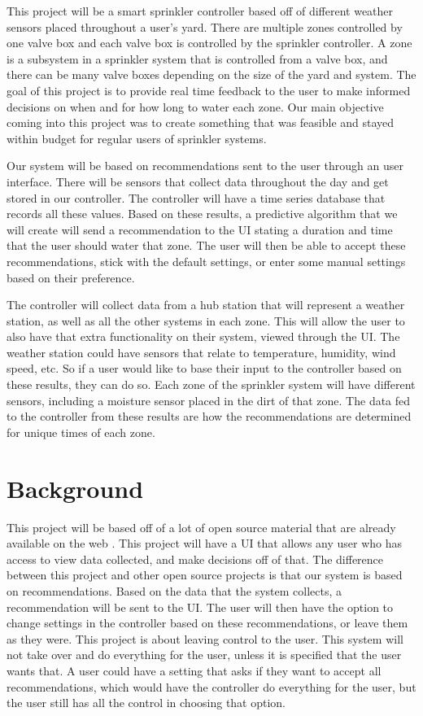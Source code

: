 \documentclass[letterpaper, 10 pt, conference]{ieeeconf}  %
\begin{document}
This project will be a smart sprinkler controller based off of different weather sensors placed throughout a user's yard. There are multiple zones controlled by one valve box and each valve box is controlled by the sprinkler controller. A zone is a subsystem in a sprinkler system that is controlled from a valve box, and there can be many valve boxes depending on the size of the yard and system. The goal of this project is to provide real time feedback to the user to make informed decisions on when and for how long to water each zone. Our main objective coming into this project was to create something that was feasible and stayed within budget for regular users of sprinkler systems.

Our system will be based on recommendations sent to the user through an user interface. There will be sensors that collect data throughout the day and get stored in our controller. The controller will have a time series database that records all these values. Based on these results, a predictive algorithm that we will create will send a recommendation to the UI stating a duration and time that the user should water that zone. The user will then be able to accept these recommendations, stick with the default settings, or enter some manual settings based on their preference. 

The controller will collect data from a hub station that will represent a weather station, as well as all the other systems in each zone. This will allow the user to also have that extra functionality on their system, viewed through the UI. The weather station could have sensors that relate to temperature, humidity, wind speed, etc. So if a user would like to base their input to the controller based on these results, they can do so. Each zone of the sprinkler system will have different sensors, including a moisture sensor placed in the dirt of that zone. The data fed to the controller from these results are how the recommendations are determined for unique times of each zone.


\section{Background}
This project will be based off of a lot of open source material that are already available on the web \cite{SIP}. This project will have a UI that allows any user who has access to view data collected, and make decisions off of that. The difference between this project and other open source projects is that our system is based on recommendations. Based on the data that the system collects, a recommendation will be sent to the UI. The user will then have the option to change settings in the controller based on these recommendations, or leave them as they were. This project is about leaving control to the user. This system will not take over and do everything for the user, unless it is specified that the user wants that. A user could have a setting that asks if they want to accept all recommendations, which would have the controller do everything for the user, but the user still has all the control in choosing that option. 
\end{document}
